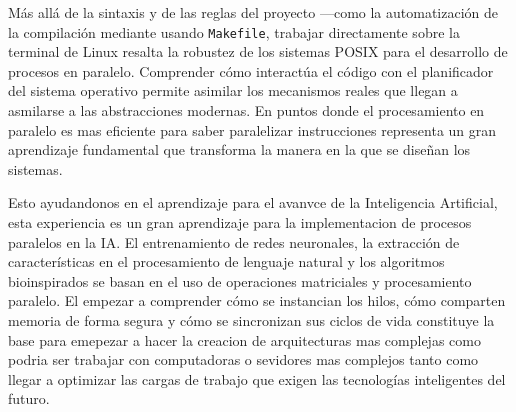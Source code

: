 \documentclass{article}
\begin{document}
Más allá de la sintaxis y de las reglas del proyecto —como la automatización de la compilación mediante usando \texttt{Makefile}, trabajar directamente sobre la terminal de Linux resalta la robustez de los sistemas POSIX para el desarrollo de procesos en paralelo. Comprender cómo interactúa el código con el planificador del sistema operativo permite asimilar los mecanismos reales que llegan a asmilarse a las abstracciones modernas. En puntos donde el procesamiento en paralelo es mas eficiente para saber paralelizar instrucciones representa un gran aprendizaje fundamental que transforma la manera en la que se diseñan los sistemas.

Esto ayudandonos en el aprendizaje para el avanvce de la Inteligencia Artificial, esta experiencia es un gran aprendizaje para la implementacion de procesos paralelos en la IA. El entrenamiento de redes neuronales, la extracción de características en el procesamiento de lenguaje natural y los algoritmos bioinspirados se basan en el uso de operaciones matriciales y procesamiento paralelo. El empezar a comprender cómo se instancian los hilos, cómo comparten memoria de forma segura y cómo se sincronizan sus ciclos de vida constituye la base para emepezar a hacer la creacion de arquitecturas mas complejas como podria ser trabajar con computadoras o sevidores mas complejos tanto como llegar a optimizar las cargas de trabajo que exigen las tecnologías inteligentes del futuro.
\end{document}
